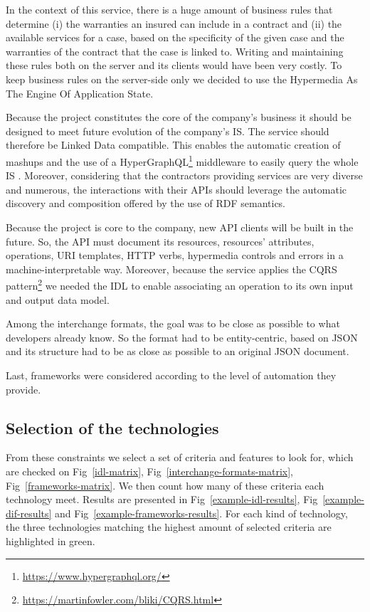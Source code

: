 In the context of this service, there is a huge amount of business rules that determine (i) the warranties an insured can include in a contract and (ii) the available services for a case, based on the specificity of the given case and the warranties of the contract that the case is linked to. Writing and maintaining these rules both on the server and its clients would have been very costly. To keep business rules on the server-side only we decided to use the Hypermedia As The Engine Of Application State.

Because the project constitutes the core of the company's business it should be designed to meet future evolution of the company's IS. 
The service should therefore be Linked Data compatible. This enables the automatic creation of mashups and the use of a HyperGraphQL\footnote{\url{https://www.hypergraphql.org/}} middleware to easily query the whole IS \cite{Tuchinda:2011:BMD:1993053.1993058}.
Moreover, considering that the contractors providing services are very diverse and numerous, the interactions with their APIs should leverage the automatic discovery and composition offered by the use of RDF semantics.

Because the project is core to the company, new API clients will be built in the future. So, the API must document its resources, resources' attributes, operations, URI templates, HTTP verbs, hypermedia controls and errors in a machine-interpretable way. Moreover, because the service applies the CQRS pattern\footnote{\url{https://martinfowler.com/bliki/CQRS.html}} we needed the IDL to enable associating an operation to its own input and output data model.

Among the interchange formats, the goal was to be close as possible to what developers already know. So the format had to be entity-centric, based on JSON and its structure had to be as close as possible to an original JSON document.

Last, frameworks were considered according to the level of automation they provide.

\subsection{Selection of the technologies}

From these constraints we select a set of criteria and features to look for, which are checked on Fig~\ref{idl-matrix}, Fig~\ref{interchange-formats-matrix}, Fig~\ref{frameworks-matrix}. We then count how many of these criteria each technology meet. Results are presented in Fig~\ref{example-idl-results}, Fig~\ref{example-dif-results} and Fig~\ref{example-frameworks-results}. For each kind of technology, the three technologies matching the highest amount of selected criteria are highlighted in green.

